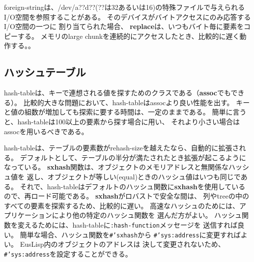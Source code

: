 foreign-stringは、/dev/a??d??(??は32あるいは16)の特殊ファイルで与えられる
I/O空間を参照することがある。
そのデバイスがバイトアクセスにのみ応答するI/O空間の一つに
割り当てられた場合、
{\bf replace}は、いつもバイト毎に要素をコピーする。
メモリのlarge chunkを連続的にアクセスしたとき、比較的に遅く動作する。。

\begin{refdesc}


\end{refdesc}
\newpage

\subsection{ハッシュテーブル}

hash-tableは、キーで連想される値を探すためのクラスである（{\bf assoc}でもできる）。
比較的大きな問題において、hash-tableはassocより良い性能を出す。
キーと値の組数が増加しても探索に要する時間は、一定のままである。
簡単に言うと、hash-tableは100以上の要素から探す場合に用い、
それより小さい場合はassocを用いるべきである。

hash-tableは、テーブルの要素数がrehash-sizeを越えたなら、自動的に拡張される。
デフォルトとして、テーブルの半分が満たされたとき拡張が起こるようになっている。
{\bf sxhash}関数は、オブジェクトのメモリアドレスと無関係なハッシュ値を
返し、オブジェクトが等しい(equal)ときのハッシュ値はいつも同じである。
それで、hash-tableはデフォルトのハッシュ関数に{\bf sxhash}を使用している
ので、再ロード可能である。
{\bf sxhash}がロバストで安全な間は、
列やtreeの中のすべての要素を探索するため、比較的に遅い。
高速なハッシュのためには、アプリケーションにより他の特定のハッシュ関数を
選んだ方がよい。
ハッシュ関数を変えるためには、hash-tableに{\tt :hash-function}メッセージを
送信すれば良い。
簡単な場合、ハッシュ関数を{\tt \#'sxhash}から
{\tt \#'sys:address}に変更すればよい。
EusLisp内のオブジェクトのアドレスは
決して変更されないため、{\tt \#'sys:address}を設定することができる。

